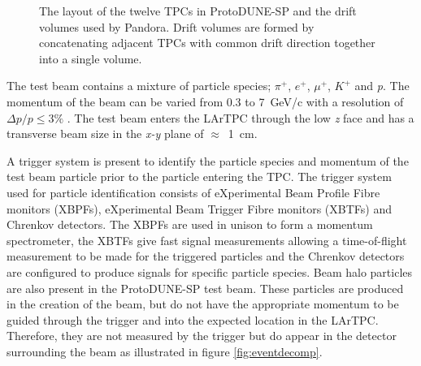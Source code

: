 \begin{figure}
\centering
{}
\caption{The layout of \protect{} the twelve TPCs in ProtoDUNE-SP and \protect{} the drift volumes used by Pandora.  Drift volumes are formed by concatenating adjacent TPCs with common drift direction together into a single volume.}
\label{fig:tpcs}
\end{figure}

The test beam contains a mixture of particle species; $\pi^{+}$, $e^{+}$, $\mu^{+}$, $K^{+}$ and \textit{p}.  The momentum of the beam can be varied from 0.3 to 7~GeV/c with a resolution of $\Delta p/p \leq 3\%$ \cite{pdtdr}.  The test beam enters the LArTPC through the low \textit{z} face and has a transverse beam size in the \textit{x-y} plane of $\approx$~1~cm.

A trigger system is present to identify the particle species and momentum of the test beam particle prior to the particle entering the TPC.  The trigger system used for particle identification consists of eXperimental Beam Profile Fibre monitors (XBPFs), eXperimental Beam Trigger Fibre monitors (XBTFs) and Chrenkov detectors.  The XBPFs are used in unison to form a momentum spectrometer, the XBTFs give fast signal measurements allowing a time-of-flight measurement to be made for the triggered particles and the Chrenkov detectors are configured to produce signals for specific particle species.  Beam halo particles are also present in the ProtoDUNE-SP test beam.  These particles are produced in the creation of the beam, but do not have the appropriate momentum to be guided through the trigger and into the expected location in the LArTPC.  Therefore, they are not measured by the trigger but do appear in the detector surrounding the beam as illustrated in figure \ref{fig:eventdecomp}.

